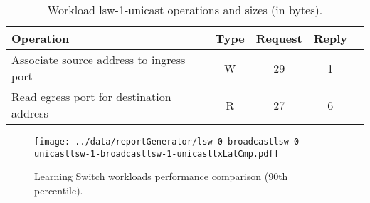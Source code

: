 \documentclass[12pt,openright,twoside]{report}
\begin{document}
\begin{table}[ht]
\small
\centering 
\begin{tabular}{l c c c c}
Operation & Type & Request & Reply \\ \toprule 
Associate source address to ingress port & W & 29 & 1\\
Read egress port for destination address & R & 27 & 6 \\ \bottomrule
\end{tabular}
\caption[Workload lsw-1-unicast operations]{Workload lsw-1-unicast operations and sizes (in bytes).}
\label{table:lsw1:unicast}
\end{table}

\begin{figure}[ht]
\centering
\texttt{[image: ../data/reportGenerator/lsw-0-broadcastlsw-0-unicastlsw-1-broadcastlsw-1-unicasttxLatCmp.pdf]}
\caption[Learning Switch workloads performance comparison]{Learning
  Switch workloads performance comparison (90th percentile). }
\label{fig:lsw:comparison}
\end{figure}
\end{document}
